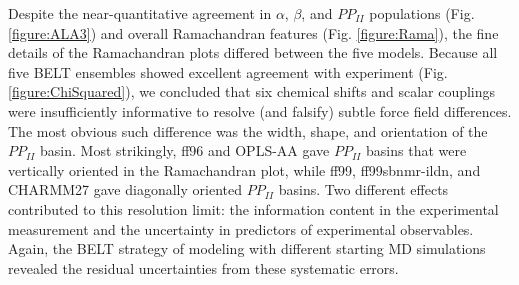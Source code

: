 \documentclass[journal=jacsat,manuscript=article]{achemso}
\begin{document}
Despite the near-quantitative agreement in $\alpha$, $\beta$, and $PP_{II}$ populations (Fig. \ref{figure:ALA3}) and overall Ramachandran features (Fig. \ref{figure:Rama}), the fine details of the Ramachandran plots differed between the five models.  Because all five BELT ensembles showed excellent agreement with experiment (Fig. \ref{figure:ChiSquared}), we concluded that six chemical shifts and scalar couplings were insufficiently informative to resolve (and falsify) subtle force field differences.  The most obvious such difference was the width, shape, and orientation of the $PP_{II}$ basin.  Most strikingly, ff96 and OPLS-AA gave $PP_{II}$ basins that were vertically oriented in the Ramachandran plot, while ff99, ff99sbnmr-ildn, and CHARMM27 gave diagonally oriented $PP_{II}$ basins.  Two different effects contributed to this resolution limit: the information content in the experimental measurement and the uncertainty in predictors of experimental observables. Again, the BELT strategy of modeling with 
different starting MD simulations revealed the residual uncertainties from these systematic errors.
\end{document}
